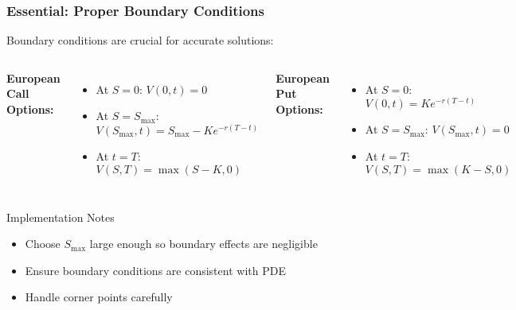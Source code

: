\documentclass{beamer}
\begin{document}
\begin{frame}
\frametitle{Essential: Proper Boundary Conditions}
Boundary conditions are crucial for accurate solutions:

\begin{columns}
\textbf{European Call Options:}
\begin{itemize}
\item At $S = 0$: $V(0,t) = 0$
\item At $S = S_{\max}$: \\$V(S_{\max},t) = S_{\max} - Ke^{-r(T-t)}$
\item At $t = T$: \\$V(S,T) = \max(S-K, 0)$
\end{itemize}

\textbf{European Put Options:}
\begin{itemize}
\item At $S = 0$: $V(0,t) = Ke^{-r(T-t)}$
\item At $S = S_{\max}$: $V(S_{\max},t) = 0$
\item At $t = T$: \\$V(S,T) = \max(K-S, 0)$
\end{itemize}
\end{columns}

\begin{block}{Implementation Notes}
\begin{itemize}
\item Choose $S_{\max}$ large enough so boundary effects are negligible
\item Ensure boundary conditions are consistent with PDE
\item Handle corner points carefully
\end{itemize}
\end{block}
\end{frame}
\end{document}

